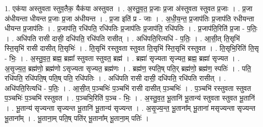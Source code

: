 \documentclass[17pt]{extarticle}
\begin{document}
1. एक॑या अस्तुवता स्तुव॒तैक॒ यैक॑या अस्तुवत । . अ॒स्तु॒व॒त॒ प्र॒जाः प्र॒जा अ॑स्तुवता स्तुवत प्र॒जाः । . प्र॒जा अ॑धीयन्ता धीयन्त प्र॒जाः प्र॒जा अ॑धीयन्त । . प्र॒जा इति॑ प्र - जाः । . अ॒धी॒य॒न्त॒ प्र॒जाप॑तिः प्र॒जाप॑ति रधीयन्ता धीयन्त प्र॒जाप॑तिः । . प्र॒जाप॑ति॒ रधि॑पति॒ रधि॑पतिः प्र॒जाप॑तिः प्र॒जाप॑ति॒ रधि॑पतिः । . प्र॒जाप॑ति॒रिति॑ प्र॒जा - प॒तिः॒ । . अधि॑पति रासी दासी॒ दधि॑पति॒ रधि॑पति रासीत् । . अधि॑पति॒रित्यधि॑ - प॒तिः॒ । . आ॒सी॒त् ति॒सृभि॑ स्ति॒सृभि॑ रासी दासीत् ति॒सृभिः॑ । . ति॒सृभि॑ रस्तुवता स्तुवत ति॒सृभि॑ स्ति॒सृभि॑ रस्तुवत । . ति॒सृभि॒रिति॑ ति॒सृ - भिः॒ । . अ॒स्तु॒व॒त॒ ब्रह्म॒ ब्रह्मा᳚ स्तुवता स्तुवत॒ ब्रह्म॑ । . ब्रह्मा॑ सृज्यता सृज्यत॒ ब्रह्म॒ ब्रह्मा॑ सृज्यत । . अ॒सृ॒ज्य॒त॒ ब्रह्म॑णो॒ ब्रह्म॑णो ऽसृज्यता सृज्यत॒ ब्रह्म॑णः । . ब्रह्म॑ण॒ स्पति॒ष् पति॒र् ब्रह्म॑णो॒ ब्रह्म॑ण॒ स्पतिः॑ । . पति॒ रधि॑पति॒ रधि॑पति॒ष् पति॒ष् पति॒ रधि॑पतिः । . अधि॑पति रासी दासी॒ दधि॑पति॒ रधि॑पति रासीत् । . अधि॑पति॒रित्यधि॑ - प॒तिः॒ । . आ॒सी॒त् प॒ञ्चभिः॑ प॒ञ्चभि॑ रासी दासीत् प॒ञ्चभिः॑ । . प॒ञ्चभि॑ रस्तुवता स्तुवत प॒ञ्चभिः॑ प॒ञ्चभि॑ रस्तुवत । . प॒ञ्चभि॒रिति॑ प॒ञ्च - भिः॒ । . अ॒स्तु॒व॒त॒ भू॒तानि॑ भू॒तान्य॑ स्तुवता स्तुवत भू॒तानि॑ । . भू॒तान्य॑ सृज्यन्ता सृज्यन्त भू॒तानि॑ भू॒तान्य॑ सृज्यन्त । . अ॒सृ॒ज्य॒न्त॒ भू॒ताना᳚म् भू॒ताना॑ मसृज्यन्ता सृज्यन्त भू॒ताना᳚म् । . भू॒ताना॒म् पति॒ष् पति॑र् भू॒ताना᳚म् भू॒ताना॒म् पतिः॑ । \newline
\end{document}
